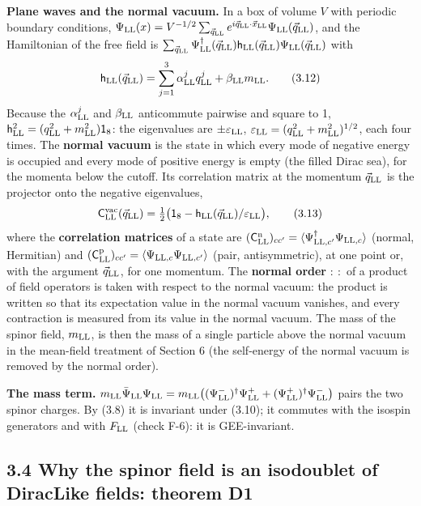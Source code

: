 \documentclass[
  10pt,
]{article}
\begin{document}
\textbf{Plane waves and the normal vacuum.} In a box of volume \(V\)
with periodic boundary conditions,
\(\Psi_{\rm LL}(x)=V^{-1/2}\sum_{\vec q_{\rm LL}}e^{i\vec q_{\rm LL}\cdot\vec x_{\rm LL}}\Psi_{\rm LL}(\vec q_{\rm LL})\),
and the Hamiltonian of the free field is
\(\sum_{\vec q_{\rm LL}}\Psi^\dagger_{\rm LL}(\vec q_{\rm LL})\mathsf h_{\rm LL}(\vec q_{\rm LL})\Psi_{\rm LL}(\vec q_{\rm LL})\)
with
\[\mathsf h_{\rm LL}(\vec q_{\rm LL})=\sum_{j=1}^3\alpha^j_{\rm LL}q^j_{\rm LL}+\beta_{\rm LL}m_{\rm LL}.\tag{3.12}\]
Because the \(\alpha^j_{\rm LL}\) and \(\beta_{\rm LL}\) anticommute
pairwise and square to 1,
\(\mathsf h_{\rm LL}^2=(q_{\rm LL}^2+m_{\rm LL}^2)\mathsf 1_8\): the
eigenvalues are \(\pm\varepsilon_{\rm LL}\),
\(\varepsilon_{\rm LL}=(q_{\rm LL}^2+m_{\rm LL}^2)^{1/2}\), each four
times. The \textbf{normal vacuum} is the state in which every mode of
negative energy is occupied and every mode of positive energy is empty
(the filled Dirac sea), for the momenta below the cutoff. Its
correlation matrix at the momentum \(\vec q_{\rm LL}\) is the projector
onto the negative eigenvalues,
\[\mathsf C^{\rm vac}_{\rm LL}(\vec q_{\rm LL})=\tfrac12\big(\mathsf 1_8-\mathsf h_{\rm LL}(\vec q_{\rm LL})/\varepsilon_{\rm LL}\big),\tag{3.13}\]
where the \textbf{correlation matrices} of a state are
\((\mathsf C^{\rm n}_{\rm LL})_{cc'}=\langle\Psi^\dagger_{{\rm LL},c'}\Psi_{{\rm LL},c}\rangle\)
(normal, Hermitian) and
\((\mathsf C^{\rm p}_{\rm LL})_{cc'}=\langle\Psi_{{\rm LL},c}\Psi_{{\rm LL},c'}\rangle\)
(pair, antisymmetric), at one point or, with the argument
\(\vec q_{\rm LL}\), for one momentum. The \textbf{normal order}
\(:\ :\) of a product of field operators is taken with respect to the
normal vacuum: the product is written so that its expectation value in
the normal vacuum vanishes, and every contraction is measured from its
value in the normal vacuum. The mass of the spinor field,
\(m_{\rm LL}\), is then the mass of a single particle above the normal
vacuum in the mean-field treatment of Section 6 (the self-energy of the
normal vacuum is removed by the normal order).

\textbf{The mass term.}
\(m_{\rm LL}\bar\Psi_{\rm LL}\Psi_{\rm LL}=m_{\rm LL}\big((\Psi^-_{\rm LL})^\dagger\Psi^+_{\rm LL}+(\Psi^+_{\rm LL})^\dagger\Psi^-_{\rm LL}\big)\)
pairs the two spinor charges. By (3.8) it is invariant under (3.10); it
commutes with the isospin generators and with \(F_{\rm LL}\) (check
F-6): it is GEE-invariant.

\hypertarget{why-the-spinor-field-is-an-isodoublet-of-diraclike-fields-theorem-d1}{%
\subsection{3.4 Why the spinor field is an isodoublet of DiracLike
fields: theorem
D1}\label{why-the-spinor-field-is-an-isodoublet-of-diraclike-fields-theorem-d1}}
\end{document}
